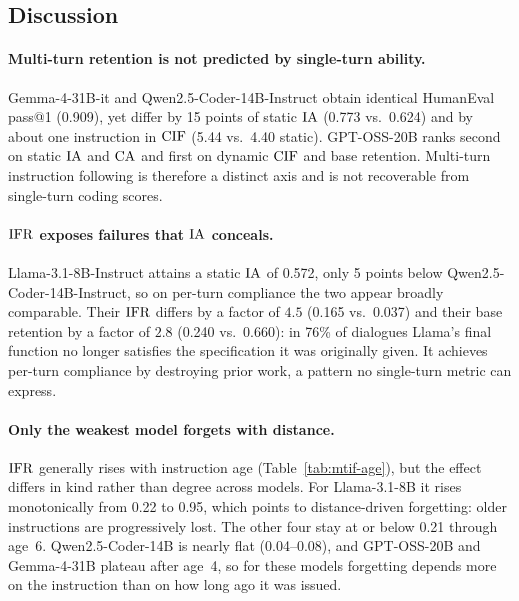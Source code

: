 \subsection{Discussion}

\paragraph{Multi-turn retention is not predicted by single-turn ability.}
Gemma-4-31B-it and Qwen2.5-Coder-14B-Instruct obtain identical HumanEval
pass@1 (0.909), yet differ by 15 points of static $\mathrm{IA}$ (0.773 vs.\ 0.624) and
by about one instruction in $\mathrm{CIF}$ (5.44 vs.\ 4.40 static). GPT-OSS-20B ranks
second on static $\mathrm{IA}$ and $\mathrm{CA}$ and first on dynamic $\mathrm{CIF}$ and base retention.
Multi-turn instruction following is therefore a distinct axis and is not
recoverable from single-turn coding scores.

\paragraph{$\mathrm{IFR}$ exposes failures that $\mathrm{IA}$ conceals.}
Llama-3.1-8B-Instruct attains a static $\mathrm{IA}$ of 0.572, only 5 points below
Qwen2.5-Coder-14B-Instruct, so on per-turn compliance the two appear broadly
comparable. Their $\mathrm{IFR}$ differs by a factor of $4.5$ (0.165 vs.\ 0.037) and
their base retention by a factor of $2.8$ (0.240 vs.\ 0.660): in 76\% of
dialogues Llama's final function no longer satisfies the specification it was
originally given. It achieves per-turn compliance by destroying prior work, a
pattern no single-turn metric can express.

\paragraph{Only the weakest model forgets with distance.}
$\mathrm{IFR}$ generally rises with instruction age (Table~\ref{tab:mtif-age}), but
the effect differs in kind rather than degree across models. For
Llama-3.1-8B it rises monotonically from 0.22 to 0.95, which points to
distance-driven forgetting: older instructions are progressively lost. The
other four stay at or below 0.21 through age~6. Qwen2.5-Coder-14B is nearly
flat (0.04--0.08), and GPT-OSS-20B and Gemma-4-31B plateau after age~4, so
for these models forgetting depends more on the instruction than on how long
ago it was issued.

